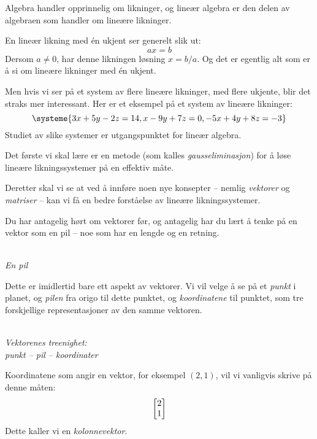 Algebra handler opprinnelig om likninger, og lineær algebra er den
delen av algebraen som handler om lineære likninger.

En lineær likning med én ukjent ser generelt slik ut:
\[
ax = b
\]
Dersom $a \ne 0$, har denne likningen løsning $x = b/a$.  Og det er
egentlig alt som er å si om lineære likninger med én ukjent.

Men hvis vi ser på et system av flere lineære likninger, med flere
ukjente, blir det straks mer interessant.  Her er et eksempel på et
system av lineære likninger:
\[
\systeme{
  3x + 5y - 2z = 14,
   x - 9y + 7z = 0,
 -5x + 4y + 8z = -3
}
\]
Studiet av slike systemer er utgangspunktet for lineær algebra.

Det første vi skal lære er en metode (som kalles
\emph{gausseliminasjon}) for å løse lineære likningssystemer på en
effektiv måte.

Deretter skal vi se at ved å innføre noen nye konsepter -- nemlig
\emph{vektorer} og \emph{matriser} -- kan vi få en bedre forståelse av
lineære likningssystemer.

Du har antagelig hørt om vektorer før, og antagelig har du lært å
tenke på en vektor som en pil -- noe som har en lengde og en retning.
\begin{center}
\\
{\small\it En pil}
\end{center}
Dette er imidlertid bare ett aspekt av vektorer.  Vi vil velge å se på
et \emph{punkt} i planet, og \emph{pilen} fra origo til dette punktet, og
\emph{koordinatene} til punktet, som tre forskjellige representasjoner
av den samme vektoren.
\begin{center}
\\
{\small\it Vektorenes treenighet:\\punkt -- pil -- koordinater}
\end{center}
Koordinatene som angir en vektor, for eksempel $(2,1)$, vil vi
vanligvis skrive på denne måten:
\[
\begin{bmatrix} 2 \\ 1 \end{bmatrix}
\]
Dette kaller vi en \emph{kolonnevektor}.


